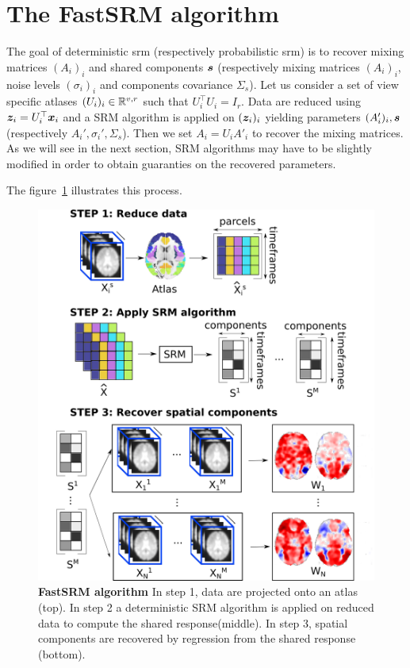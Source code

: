 \section{The FastSRM algorithm}
The goal of deterministic srm (respectively probabilistic srm) is to recover mixing matrices $(A_i)_i$ and shared
components $\boldsymbol{s}$ (respectively mixing matrices $(A_i)_i$, noise levels
$(\sigma_i)_i$ and components covariance $\Sigma_s$). 
Let us consider a set of view specific atlases $(U_i)_i \in \mathbb{R}^{v, r}$ such that
$U_i^{\top}U_i = I_r$.
Data are reduced using $\boldsymbol{z}_i = U_i^{\top} \boldsymbol{x}_i$ and a SRM algorithm is applied
on $(\boldsymbol{z}_i)_i$ yielding parameters $(A_i')_i, \boldsymbol{s}$ (respectively $A_i',
\sigma_i', \Sigma_s$). Then we set $A_i = U_i A'_i$ to recover the mixing matrices.
As we will see in the next section, SRM algorithms may have to be slightly
modified in order to obtain guaranties on the recovered parameters.

The figure~\ref{fig:srm:conceptual} illustrates this process.
\begin{figure}
  \centering
  \includegraphics[scale=0.34]{figures/srm/conceptual_figure2.png}
  \caption{\textbf{FastSRM algorithm} In step 1, data are projected onto an atlas (top). In step 2 a deterministic SRM algorithm is applied on reduced data to compute the shared response(middle). In step 3, spatial components are recovered by regression from the shared response (bottom).}
  \label{fig:srm:conceptual}
\end{figure}

